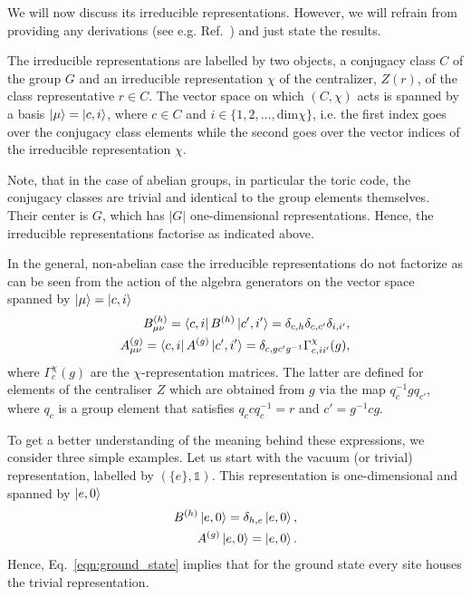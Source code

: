 \documentclass[two column]{article}
\begin{document}
We will now discuss its irreducible representations. However, we will refrain from providing any derivations (see e.g. Ref.~\cite{Cui_2015}) and just state the results. 

The irreducible representations are labelled by two objects, a conjugacy class $C$ of the group $G$ and an irreducible representation $\chi$ of the centralizer, $Z(r)$, of the class representative $r \in C$. The vector space on which $(C, \chi)$ acts is spanned by a basis $\ket{\mu} = \ket{c, i}$, where $c \in C$ and $i \in \{1, 2, \ldots, \text{dim}\chi\}$, i.e. the first index goes over the conjugacy class elements while the second goes over the vector indices of the irreducible representation $\chi$.

Note, that in the case of abelian groups, in particular the toric code, the conjugacy classes are trivial and identical to the group elements themselves. Their center is $G$, which has $|G|$ one-dimensional representations. Hence, the irreducible representations factorise as indicated above. 

In the general, non-abelian case the irreducible representations do not factorize as can be seen from the action of the algebra generators on the vector space spanned by $\ket{\mu}=\ket{c,i}$ %
\begin{equation}
    \begin{split}
        B^{(h)}_{\mu\nu}=\bra{c, i} B^{(h)} \ket{c', i'} = \delta_{c, h} \delta_{c, c'}\delta_{i, i'}, \\
        A^{(g)}_{\mu\nu} = \bra{c, i} A^{(g)} \ket{c', i'} = \delta_{c,gc'g^{-1}} \Gamma^\chi_{c,ii'}(g),
    \end{split}
\end{equation}
where $\Gamma^\chi_c(g)$ are the $\chi$-representation matrices. The latter are defined for elements of the centraliser $Z$ which are obtained from $g$ via the map $q_{c}^{-1}gq_{c'}$, where $q_c$ is a group element that satisfies $q_c c q_c^{-1} = r$ and $c'=g^{-1}cg$. 


To get a better understanding of the meaning behind these expressions, we consider three simple examples. Let us start with the vacuum (or trivial) representation, labelled by $(\{e\}, \mathbb{1})$. This representation is one-dimensional and spanned by $\ket{e, 0}$
\begin{equation}
    \begin{split}
        B^{(h)}\ket{e, 0} = \delta_{h,e}\ket{e, 0},\\
        A^{(g)}\ket{e, 0} = \ket{e,0}.
    \end{split}
\end{equation}
Hence, Eq.~\eqref{eqn:ground_state} implies that for the ground state every site houses the trivial representation.
\end{document}

